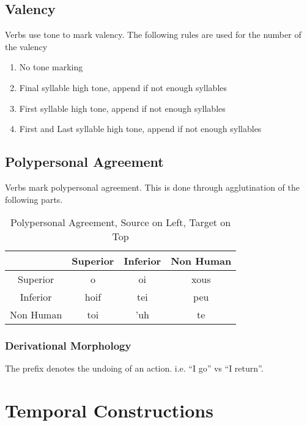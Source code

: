 \subsection{Valency}

Verbs use tone to mark valency. The following rules are used for the number of the valency

\begin{enumerate}[start=0]
    \item No tone marking
    \item Final syllable high tone, append  if not enough syllables
    \item First syllable high tone, append  if not enough syllables
    \item First and Last syllable high tone, append  if not enough syllables
\end{enumerate}

\subsection{Polypersonal Agreement}

Verbs mark polypersonal agreement. This is done through agglutination of the following parts.

\begin{table}[H]
    \centering
    \begin{tabular}{c|c c c}
                    &   Superior    &   Inferior    &   Non Human   \\\hline
        Superior    &   \dU{}o      &   \tU{}oi     &   xous        \\
        Inferior    &   hoif        &   tei         &   peu         \\
        Non Human   &   toi         &   'uh         &   te          \\
    \end{tabular}
    \caption{Polypersonal Agreement, Source on Left, Target on Top}
    \label{tab:polyag}
\end{table}

\subsubsection{Derivational Morphology}

The  prefix denotes the undoing of an action. i.e.  ``I go'' vs  ``I return''.


\section{Temporal Constructions}

